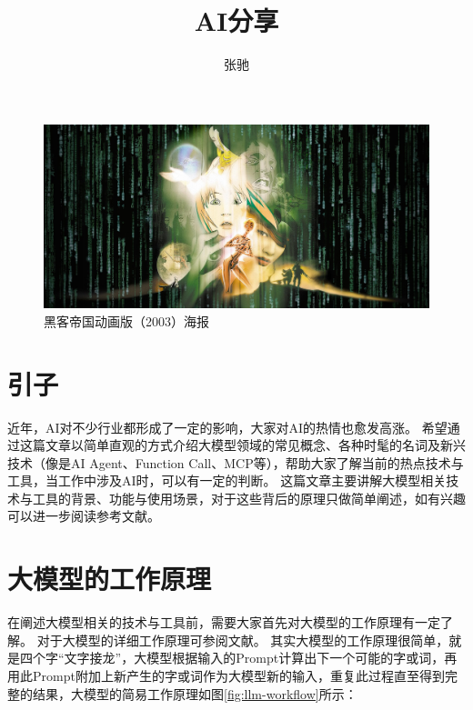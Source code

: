 \documentclass[letterpaper,11pt]{article}
\numberwithin{equation}{section}
\begin{document}
\title{AI分享}
\author{张驰}
\maketitle

\begin{figure}[htbp]
    \centering
    \includegraphics[width=1\textwidth]{../../assets/imgs/ai_share/bg.jpg}
    \caption*{黑客帝国动画版（2003）海报}
\end{figure}

\section{引子}

近年，AI对不少行业都形成了一定的影响，大家对AI的热情也愈发高涨。
希望通过这篇文章以简单直观的方式介绍大模型领域的常见概念、各种时髦的名词及新兴技术（像是AI Agent、Function Call、MCP等），帮助大家了解当前的热点技术与工具，当工作中涉及AI时，可以有一定的判断。
这篇文章主要讲解大模型相关技术与工具的背景、功能与使用场景，对于这些背后的原理只做简单阐述，如有兴趣可以进一步阅读参考文献。

\section{大模型的工作原理}

在阐述大模型相关的技术与工具前，需要大家首先对大模型的工作原理有一定了解。
对于大模型的详细工作原理可参阅文献\cite{alammar2018transformer}。
其实大模型的工作原理很简单，就是四个字“文字接龙”，大模型根据输入的Prompt计算出下一个可能的字或词，再用此Prompt附加上新产生的字或词作为大模型新的输入，重复此过程直至得到完整的结果，大模型的简易工作原理如图\ref{fig:llm-workflow}所示：
\end{document}
